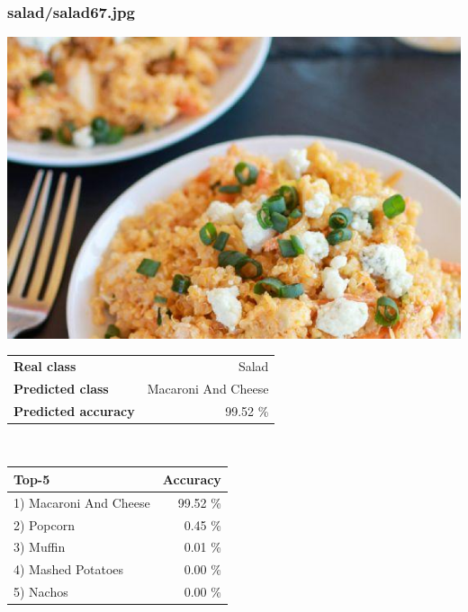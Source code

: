 \subsubsection{salad/salad67.jpg}

\begin{minipage}[t]{0.4\textwidth}
	\vspace{0pt}
	\includegraphics[width=\linewidth]{images/evaluation-images/salad/salad67.jpg}
\end{minipage}
\hfill
\begin{minipage}[t]{0.5\textwidth}
	\vspace{0pt}\raggedright
	\begin{tabularx}{\textwidth}{X r}
		\small \textbf{Real class} & \small Salad\\
		\small \textbf{Predicted class} & \small Macaroni And Cheese\\
		\small \textbf{Predicted accuracy} & \small 99.52 \%
    \end{tabularx}\\
    
    \vspace{6pt}
	\begin{tabularx}{\textwidth}{X r}
        \small \textbf{Top-5} & \small \textbf{Accuracy} \\
        \hline
		\small 1) Macaroni And Cheese & \small 99.52 \%\\\small 2) Popcorn & \small 0.45 \%\\\small 3) Muffin & \small 0.01 \%\\\small 4) Mashed Potatoes & \small 0.00 \%\\\small 5) Nachos & \small 0.00 \%
    \end{tabularx}
\end{minipage}
    
